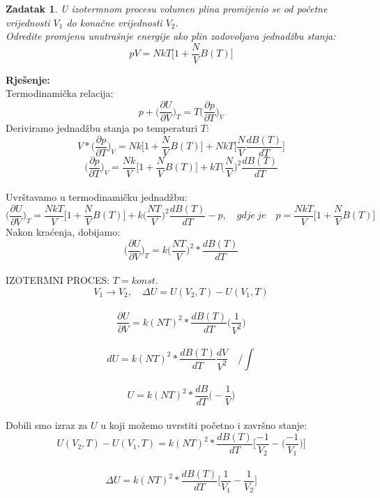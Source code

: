 \documentclass[a4paper,12pt]{article}
\newtheorem{ZDK}{Zadatak}[section]
\begin{document}
\newpage
\begin{ZDK}
	U izotermnom procesu volumen plina promijenio se od po\v{c}etne vrijednosti $V_1$ do kona\v{c}ne vrijednosti $V_2$. \\
	Odredite promjenu unutra\v{s}nje energije ako plin zadovoljava jednad\v{z}bu stanja:
	$$ pV=NkT \Big[ 1+\frac{N}{V}B(T) \Big] $$
\end{ZDK}
\textbf{Rje\v{s}enje:} \\
\newline
Termodinami\v{c}ka relacija:
$$ p+\Big( \frac{\partial U}{\partial V}  \Big)_T=T \Big( \frac{\partial p}{\partial T}  \Big)_V $$
Deriviramo jednad\v{z}bu stanja po temperaturi $T$:
$$ V*\Big( \frac{\partial p}{\partial T} \Big)_V=Nk \Big[ 1+\frac{N}{V}B(T) \Big] +NkT \Big[ \frac{N}{V}\frac{dB(T)}{dT} \Big]$$
$$ \Big( \frac{\partial p}{\partial T} \Big)_V=\frac{Nk}{V} \Big[ 1+\frac{N}{V}B(T) \Big] +kT \Big( \frac{N}{V}  \Big)^2 \frac{dB(T)}{dT} $$
\\
Uvr\v{s}tavamo u termodinami\v{c}ku jednad\v{z}bu:
$$ \Big( \frac{\partial U}{\partial V} \Big)_T=\frac{NkT}{V} \Big[ 1+\frac{N}{V}B(T) \Big] +k \Big( \frac{NT}{V}  \Big)^2 \frac{dB(T)}{dT}-p, \quad gdje\ je \quad
p=\frac{NkT}{V} \Big[ 1+\frac{N}{V}B(T) \Big] $$
Nakon kra\'cenja, dobijamo:
$$ \Big( \frac{\partial U}{\partial V} \Big)_T=k \Big( \frac{NT}{V}  \Big)^2* \frac{dB(T)}{dT} $$
\\
IZOTERMNI PROCES: $T=konst.$
\\
$$ V_1 \rightarrow V_2, \quad \Delta U=U(V_2,T)-U(V_1,T) $$
\\
$$ \frac{\partial U}{\partial V} = k(NT)^2* \frac{dB(T)}{dT} \Big( \frac{1}{V^2} \Big) $$
\\
$$ dU= k(NT)^2* \frac{dB(T)}{dT} \frac{dV}{V^2} \quad \Big/ \int $$
\\
$$ U=k(NT)^2* \frac{dB}{dT} \Big( -\frac{1}{V} \Big) $$
\\
\newline
Dobili smo izraz za $U$ u koji mo\v{z}emo uvrstiti po\v{c}etno i zavr\v{s}no stanje:
\\
$$ U(V_2,T)-U(V_1,T)=k(NT)^2* \frac{dB(T)}{dT} \Big[ \frac{-1}{V_2}- \Big( \frac{-1}{V_1} \Big) \Big] $$
\\
$$ \Delta U=k(NT)^2* \frac{dB(T)}{dT} \Big[ \frac{1}{V_1}-\frac{1}{V_2} \Big] $$
\end{document}
